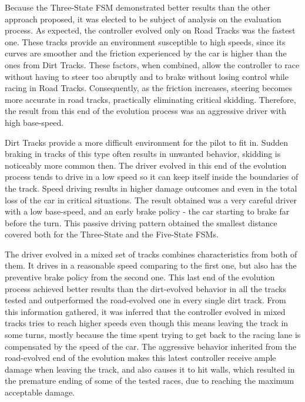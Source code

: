 	Because the Three-State FSM demonstrated better results than the other approach proposed, it was elected to be subject of analysis on the evaluation process. As expected, the controller evolved only on Road Tracks was the fastest one. These tracks provide an environment susceptible to high speeds, since its curves are smoother and the friction experienced by the car is higher than the ones from Dirt Tracks. These factors, when combined, allow the controller to race without having to steer too abruptly and to brake without losing control while racing in Road Tracks. Consequently, as the friction increases, steering becomes more accurate in road tracks, practically eliminating critical skidding. Therefore, the result from this end of the evolution process was an aggressive driver with high base-speed.
	
	Dirt Tracks provide a more difficult environment for the pilot to fit in. Sudden braking in tracks of this type often results in unwanted behavior, skidding is noticeably more common then. The driver evolved in this end of the evolution process tends to drive in a low speed so it can keep itself inside the boundaries of the track. Speed driving results in higher damage outcomes and even in the total loss of the car in critical situations. The result obtained was a very careful driver with a low base-speed, and an early brake policy - the car starting to brake far before the turn. This passive driving pattern obtained the smallest distance covered both for the Three-State and the Five-State FSMs.
	
	The driver evolved in a mixed set of tracks combines characteristics from both of them. It drives in a reasonable speed comparing to the first one, but also has the preventive brake policy from the second one. This last end of the evolution process achieved better results than the dirt-evolved behavior in all the tracks tested and outperformed the road-evolved one in every single dirt track. From this information gathered, it was inferred that the controller evolved in mixed tracks tries to reach higher speeds even though this means leaving the track in some turns, mostly because the time spent trying to get back to the racing lane is compensated by the speed of the car. The aggressive behavior inherited from the road-evolved end of the evolution makes this latest controller receive ample damage when leaving the track, and also causes it to hit walls, which resulted in the premature ending of some of the tested races, due to reaching the maximum acceptable damage.
	
